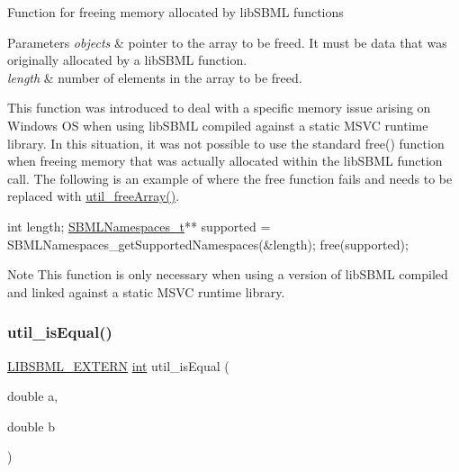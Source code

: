 Function for freeing memory allocated by lib\+S\+B\+ML functions


\begin{DoxyParams}{Parameters}
{\em objects} & pointer to the array to be freed. It must be data that was originally allocated by a lib\+S\+B\+ML function. \\
\hline
{\em length} & number of elements in the array to be freed.\\
\hline
\end{DoxyParams}
This function was introduced to deal with a specific memory issue arising on Windows OS when using lib\+S\+B\+ML compiled against a static M\+S\+VC runtime library. In this situation, it was not possible to use the standard {\ttfamily free()} function when freeing memory that was actually allocated within the lib\+S\+B\+ML function call. The following is an example of where the free function fails and needs to be replaced with \hyperlink{dependencies_2libsbml-5_815_80-vs2017-release-64_2include_2sbml_2util_2util_8h_a322d811aff951aaba39641d1ad148db9}{util\+\_\+free\+Array()}. 
\begin{DoxyCode}
\textcolor{keywordtype}{int} length;
\hyperlink{sbmlfwd_8h_a9d371851bb341b7efc8935a3d0c2b4df}{SBMLNamespaces\_t}** supported = SBMLNamespaces\_getSupportedNamespaces(&length);
free(supported);
\end{DoxyCode}


\begin{DoxyNote}{Note}
This function is only necessary when using a version of lib\+S\+B\+ML compiled and linked against a static M\+S\+VC runtime library. 
\end{DoxyNote}
\mbox{\label{dependencies_2libsbml-5_815_80-vs2017-release-64_2include_2sbml_2util_2util_8h_a5390af41d7ec3083c95f2e5c9f3d21f1}} 
\subsubsection{\texorpdfstring{util\+\_\+is\+Equal()}{util\_isEqual()}}
{\footnotesize\ttfamily \hyperlink{extern_8h_a8e9e5118f0c55d410f8bc217f2954dbf}{L\+I\+B\+S\+B\+M\+L\+\_\+\+E\+X\+T\+E\+RN} \hyperlink{lp__lib_8h_adeb9ec6400320e4923ac9d836d509ddb}{int} util\+\_\+is\+Equal (\begin{DoxyParamCaption}\item[{double}]{a,  }\item[{double}]{b }\end{DoxyParamCaption})}

